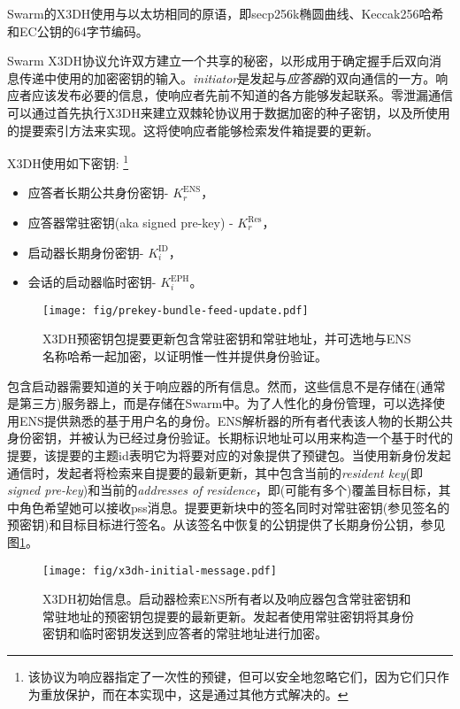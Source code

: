 Swarm的X3DH使用与以太坊相同的原语，即secp256k椭圆曲线、Keccak256哈希和EC公钥的64字节编码。

Swarm X3DH协议允许双方建立一个共享的秘密，以形成用于确定握手后双向消息传递中使用的加密密钥的输入。\emph{initiator}是发起与\emph{应答器}的双向通信的一方。响应者应该发布必要的信息，使响应者先前不知道的各方能够发起联系。零泄漏通信可以通过首先执行X3DH来建立双棘轮协议用于数据加密的种子密钥，以及所使用的提要索引方法来实现。这将使响应者能够检索发件箱提要的更新。

X3DH使用如下密钥:%
%
\footnote{该协议为响应器指定了一次性的预键，但可以安全地忽略它们，因为它们只作为重放保护，而在本实现中，这是通过其他方式解决的。}

\begin{itemize}
\item 应答者长期公共身份密钥- $K^{\mathrm{ENS}}_r$，
\item 应答器常驻密钥(aka signed pre-key) - $K^{\mathrm{Res}}_r$，
\item 启动器长期身份密钥- $K^{\mathrm{ID}}_i$，
\item 会话的启动器临时密钥- $K^{\mathrm{EPH}}_i$。
\end{itemize}{}



\begin{figure}[htbp]
   \centering
   \texttt{[image: fig/prekey-bundle-feed-update.pdf]}
   \caption[X3DH预密钥包feed更新\statusgreen]{X3DH预密钥包提要更新包含常驻密钥和常驻地址，并可选地与ENS名称哈希一起加密，以证明惟一性并提供身份验证。}
\label{fig:prekey-bundle-feed-update}
\end{figure}


包含启动器需要知道的关于响应器的所有信息。然而，这些信息不是存储在(通常是第三方)服务器上，而是存储在Swarm中。为了人性化的身份管理，可以选择使用ENS提供熟悉的基于用户名的身份。ENS解析器的所有者代表该人物的长期公共身份密钥，并被认为已经过身份验证。长期标识地址可以用来构造一个基于时代的提要，该提要的主题id表明它为将要对应的对象提供了预键包。当使用新身份发起通信时，发起者将检索来自提要的最新更新，其中包含当前的\emph{resident key}(即\emph{signed pre-key})和当前的\emph{addresses of residence}，即(可能有多个)覆盖目标目标，其中角色希望她可以接收pss消息。提要更新块中的签名同时对常驻密钥(参见签名的预密钥)和目标目标进行签名。从该签名中恢复的公钥提供了长期身份公钥，参见图\ref{fig:prekey-bundle-feed-update}。


\begin{figure}[htbp]
   \centering
   \texttt{[image: fig/x3dh-initial-message.pdf]}
   \caption[X3DH初始消息]{X3DH初始信息。启动器检索ENS所有者以及响应器包含常驻密钥和常驻地址的预密钥包提要的最新更新。发起者使用常驻密钥将其身份密钥和临时密钥发送到应答者的常驻地址进行加密。 }
\label{fig:x3dh-initial-message}
\end{figure}


